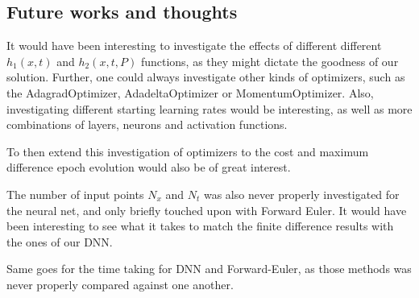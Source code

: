 \subsection{Future works and thoughts}
It would have been interesting to investigate the effects of different different $h_1(x,t)$ and $h_2(x,t,P)$ functions, as they might dictate the goodness of our solution. Further, one could always investigate other kinds of optimizers, such as the AdagradOptimizer, AdadeltaOptimizer or MomentumOptimizer. Also, investigating different starting learning rates would be interesting, as well as more combinations of layers, neurons and activation functions.

To then extend this investigation of optimizers to the cost and maximum difference epoch evolution would also be of great interest.

The number of input points $N_x$ and $N_t$ was also never properly investigated for the neural net, and only briefly touched upon with Forward Euler. It would have been interesting to see what it takes to match the finite difference results with the ones of our DNN.

Same goes for the time taking for DNN and Forward-Euler, as those methods was never properly compared against one another.